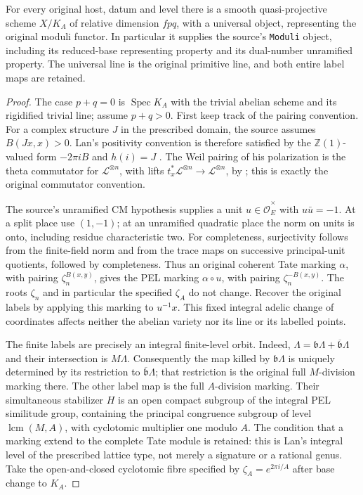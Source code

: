 \begin{theorem}\label{thm:original-generic-pel-moduli}
For every original host, datum and level there is a smooth
quasi-projective scheme $X/K_A$ of relative dimension $fpq$, with a
universal object, representing the original moduli functor. In
particular it supplies the source's \texttt{Moduli} object, including
its reduced-base representing property and its dual-number
unramified property. The universal line is the original primitive
line, and both entire label maps are retained.
\end{theorem}
\begin{proof}
The case $p+q=0$ is $\operatorname{Spec}K_A$ with the trivial abelian
scheme and its rigidified trivial line; assume $p+q>0$.
First keep track of the pairing convention. For a complex structure
$J$ in the prescribed domain, the source assumes $B(Jx,x)>0$.
Lan's positivity convention is therefore satisfied by the
$\mathbb Z(1)$-valued form $-2\pi i B$ and $h(i)=J$
\cite[Definition 1.2.1.2]{generic-pel-lan}.
The Weil pairing of his polarization is the theta commutator for
$\mathcal L^{\otimes n}$, with lifts
$t_x^*\mathcal L^{\otimes n}\to\mathcal L^{\otimes n}$, by
\cite[Definition 5.2.4.6 and Proposition 5.2.4.9]{generic-pel-lan};
this is exactly the original commutator convention.

The source's unramified CM hypothesis supplies a unit
$u\in\widehat{\mathcal O}_E^\times$ with $u\bar u=-1$.
At a split place use $(1,-1)$; at an unramified quadratic place
the norm on units is onto, including residue characteristic two.
For completeness, surjectivity follows from the finite-field norm
and from the trace maps on successive principal-unit quotients,
followed by completeness. Thus an original coherent Tate marking
$\alpha$, with pairing $\zeta_n^{B(x,y)}$, gives the PEL marking
$\alpha\circ u$, with pairing $\zeta_n^{-B(x,y)}$.
The roots $\zeta_n$ and in particular the specified $\zeta_A$ do not
change. Recover the original labels by applying this marking to
$u^{-1}x$. This fixed integral adelic change of coordinates affects
neither the abelian variety nor its line or its labelled points.

The finite labels are precisely an integral finite-level orbit.
Indeed, $\Lambda=\mathfrak b\Lambda+
\overline{\mathfrak b}\Lambda$ and their intersection is $M\Lambda$.
Consequently the map killed by $\mathfrak b\Lambda$ is uniquely
determined by its restriction to $\overline{\mathfrak b}\Lambda$;
that restriction is the original full $M$-division marking there.
The other label map is the full $A$-division marking. Their simultaneous
stabilizer $H$ is an open compact subgroup of the integral PEL
similitude group, containing the principal congruence subgroup of
level $\operatorname{lcm}(M,A)$, with cyclotomic multiplier one modulo
$A$. The condition that a marking extend to the complete Tate module
is retained: this is Lan's integral level of the prescribed lattice
type, not merely a signature or a rational genus.
Take the open-and-closed cyclotomic fibre specified by
$\zeta_A=e^{2\pi i/A}$ after base change to $K_A$.


\end{proof}

